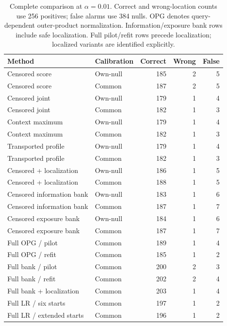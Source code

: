 \begin{table}[t]\centering
\caption{Complete comparison at $\alpha=0.01$. Correct and wrong-location counts use 256 positives; false alarms use 384 nulls. OPG denotes query-dependent outer-product normalization. Information/exposure bank rows include safe localization. Full pilot/refit rows precede localization; localized variants are identified explicitly.}
\label{tab:ablations}
\begin{tabular}{llrrr}\toprule
Method & Calibration & Correct & Wrong & False\\\midrule
Censored score & Own-null & 185 & 2 & 5\\
Censored score & Common & 187 & 2 & 5\\
Censored joint & Own-null & 179 & 1 & 4\\
Censored joint & Common & 182 & 1 & 3\\
Context maximum & Own-null & 179 & 1 & 4\\
Context maximum & Common & 182 & 1 & 3\\
Transported profile & Own-null & 179 & 1 & 4\\
Transported profile & Common & 182 & 1 & 3\\
Censored + localization & Own-null & 186 & 1 & 5\\
Censored + localization & Common & 188 & 1 & 5\\
Censored information bank & Own-null & 183 & 1 & 6\\
Censored information bank & Common & 187 & 1 & 7\\
Censored exposure bank & Own-null & 184 & 1 & 6\\
Censored exposure bank & Common & 187 & 1 & 7\\
Full OPG / pilot & Common & 189 & 1 & 4\\
Full OPG / refit & Common & 185 & 1 & 2\\
Full bank / pilot & Common & 200 & 2 & 3\\
Full bank / refit & Common & 202 & 2 & 4\\
Full bank + localization & Common & 203 & 1 & 4\\
Full LR / six starts & Common & 197 & 1 & 2\\
Full LR / extended starts & Common & 196 & 1 & 2\\
\bottomrule\end{tabular}\end{table}

